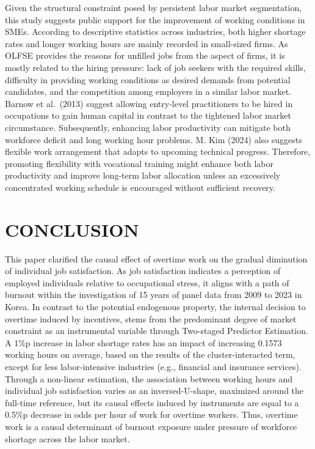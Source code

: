 \documentclass[
  12pt,
]{article}
\begin{document}
Given the structural constraint posed by persistent labor market
segmentation, this study suggests public support for the improvement of
working conditions in SMEs. According to descriptive statistics across
industries, both higher shortage rates and longer working hours are
mainly recorded in small-sized firms. As OLFSE provides the reasons for
unfilled jobs from the aspect of firms, it is mostly related to the
hiring pressure: lack of job seekers with the required skills,
difficulty in providing working conditions as desired demands from
potential candidates, and the competition among employers in a similar
labor market. Barnow et al.~(2013) suggest allowing entry-level
practitioners to be hired in occupations to gain human capital in
contrast to the tightened labor market circumstance. Subsequently,
enhancing labor productivity can mitigate both workforce deficit and
long working hour problems. M. Kim (2024) also suggests flexible work
arrangement that adapts to upcoming technical progress. Therefore,
promoting flexibility with vocational training might enhance both labor
productivity and improve long-term labor allocation unless an
excessively concentrated working schedule is encouraged without
sufficient recovery.

\newpage

\section{CONCLUSION}\label{conclusion}

This paper clarified the causal effect of overtime work on the gradual
diminution of individual job satisfaction. As job satisfaction indicates
a perception of employed individuals relative to occupational stress, it
aligns with a path of burnout within the investigation of 15 years of
panel data from 2009 to 2023 in Korea. In contrast to the potential
endogenous property, the internal decision to overtime induced by
incentives, stems from the predominant degree of market constraint as an
instrumental variable through Two-staged Predictor Estimation. A 1\%p
increase in labor shortage rates has an impact of increasing 0.1573
working hours on average, based on the results of the cluster-interacted
term, except for less labor-intensive industries (e.g., financial and
insurance services). Through a non-linear estimation, the association
between working hours and individual job satisfaction varies as an
inversed-U-shape, maximized around the full-time reference, but its
causal effects induced by instruments are equal to a 0.5\%p decrease in
odds per hour of work for overtime workers. Thus, overtime work is a
causal determinant of burnout exposure under pressure of workforce
shortage across the labor market.
\end{document}
